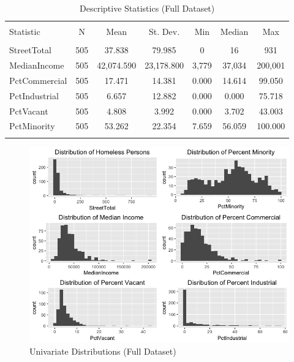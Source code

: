 \documentclass[titlepage]{article}   	%
\begin{document}
\begin{table}[!htbp] \centering 
  \caption{Descriptive Statistics (Full Dataset)} 
  \label{} 
\begin{tabular}{@{\extracolsep{5pt}}lcccccc} 
\\[-1.8ex]\hline 
\hline \\[-1.8ex] 
Statistic & \multicolumn{1}{c}{N} & \multicolumn{1}{c}{Mean} & \multicolumn{1}{c}{St. Dev.} & \multicolumn{1}{c}{Min} & \multicolumn{1}{c}{Median} & \multicolumn{1}{c}{Max} \\ 
\hline \\[-1.8ex] 
StreetTotal & 505 & 37.838 & 79.985 & 0 & 16 & 931 \\ 
MedianIncome & 505 & 42,074.590 & 23,178.800 & 3,779 & 37,034 & 200,001 \\ 
PctCommercial & 505 & 17.471 & 14.381 & 0.000 & 14.614 & 99.050 \\ 
PctIndustrial & 505 & 6.657 & 12.882 & 0.000 & 0.000 & 75.718 \\ 
PctVacant & 505 & 4.808 & 3.992 & 0.000 & 3.702 & 43.003 \\ 
PctMinority & 505 & 53.262 & 22.354 & 7.659 & 56.059 & 100.000 \\ 
\hline \\[-1.8ex] 
\end{tabular} 
\end{table} 

\begin{figure} [h]
\centering
\includegraphics[scale=.65]{Histograms}
\caption{Univariate Distributions (Full Dataset)}
\end{figure}
\end{document}
